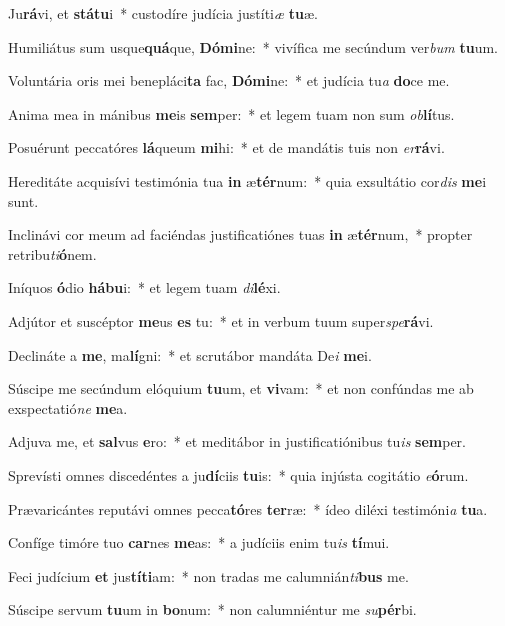 \item Ju\textbf{rá}vi, et \textbf{stá}\textbf{tu}i~* custodíre judícia justíti\textit{æ} \textbf{tu}æ.
\item Humiliátus sum usque\textbf{quá}que, \textbf{Dó}\textbf{mi}ne:~* vivífica me secúndum ver\textit{bum} \textbf{tu}um.
\item Voluntária oris mei benepláci\textbf{ta} fac, \textbf{Dó}\textbf{mi}ne:~* et judícia tu\textit{a} \textbf{do}ce me.
\item Anima mea in mánibus \textbf{me}is \textbf{sem}per:~* et legem tuam non sum \textit{ob}\textbf{lí}tus.
\item Posuérunt peccatóres \textbf{lá}queum \textbf{mi}hi:~* et de mandátis tuis non \textit{er}\textbf{rá}vi.
\item Hereditáte acquisívi testimónia tua \textbf{in} æ\textbf{tér}num:~* quia exsultátio cor\textit{dis} \textbf{me}i sunt.
\item Inclinávi cor meum ad faciéndas justificatiónes tuas \textbf{in} æ\textbf{tér}num,~* propter retribu\textit{ti}\textbf{ó}nem.
\item Iníquos \textbf{ó}dio \textbf{há}\textbf{bu}i:~* et legem tuam \textit{di}\textbf{lé}xi.
\item Adjútor et suscéptor \textbf{me}us \textbf{es} tu:~* et in verbum tuum super\textit{spe}\textbf{rá}vi.
\item Declináte a \textbf{me}, ma\textbf{lí}gni:~* et scrutábor mandáta De\textit{i} \textbf{me}i.
\item Súscipe me secúndum elóquium \textbf{tu}um, et \textbf{vi}vam:~* et non confúndas me ab exspectatió\textit{ne} \textbf{me}a.
\item Adjuva me, et \textbf{sal}vus \textbf{e}ro:~* et meditábor in justificatiónibus tu\textit{is} \textbf{sem}per.
\item Sprevísti omnes discedéntes a ju\textbf{dí}ciis \textbf{tu}is:~* quia injústa cogitátio \textit{e}\textbf{ó}rum.
\item Prævaricántes reputávi omnes pecca\textbf{tó}res \textbf{ter}ræ:~* ídeo diléxi testimóni\textit{a} \textbf{tu}a.
\item Confíge timóre tuo \textbf{car}nes \textbf{me}as:~* a judíciis enim tu\textit{is} \textbf{tí}mui.
\item Feci judícium \textbf{et} jus\textbf{tí}\textbf{ti}am:~* non tradas me calumnián\textit{ti}\textbf{bus} me.
\item Súscipe servum \textbf{tu}um in \textbf{bo}num:~* non calumniéntur me \textit{su}\textbf{pér}bi.

